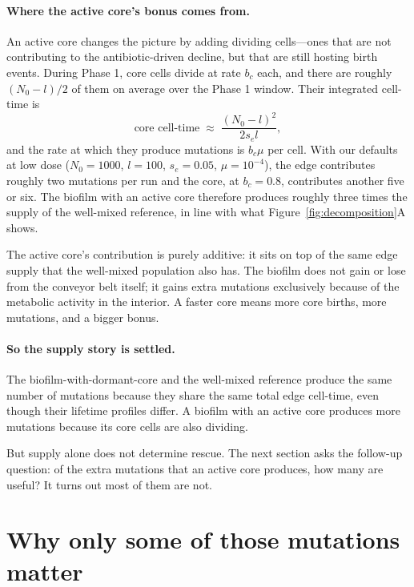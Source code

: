 \documentclass[11pt]{article}
\begin{document}
\paragraph{Where the active core's bonus comes from.}
An active core changes the picture by adding dividing cells---ones
that are not contributing to the antibiotic-driven decline, but that
are still hosting birth events. During Phase 1, core cells divide at
rate $b_c$ each, and there are roughly $(N_0 - l)/2$ of them on
average over the Phase 1 window. Their integrated cell-time is
\[
\text{core cell-time} \;\approx\; \frac{(N_0 - l)^2}{2 s_e l},
\]
and the rate at which they produce mutations is $b_c \mu$ per cell.
With our defaults at low dose ($N_0 = 1000$, $l = 100$, $s_e = 0.05$,
$\mu = 10^{-4}$), the edge contributes roughly two mutations per run
and the core, at $b_c = 0.8$, contributes another five or six. The
biofilm with an active core therefore produces roughly three times
the supply of the well-mixed reference, in line with what
Figure~\ref{fig:decomposition}A shows.

The active core's contribution is purely additive: it sits on top of
the same edge supply that the well-mixed population also has. The
biofilm does not gain or lose from the conveyor belt itself; it gains
extra mutations exclusively because of the metabolic activity in the
interior. A faster core means more core births, more mutations, and a
bigger bonus.

\paragraph{So the supply story is settled.}
The biofilm-with-dormant-core and the well-mixed reference produce
the same number of mutations because they share the same total edge
cell-time, even though their lifetime profiles differ. A biofilm with
an active core produces more mutations because its core cells are
also dividing.

But supply alone does not determine rescue. The next section asks the
follow-up question: of the extra mutations that an active core
produces, how many are useful? It turns out most of them are not.

\section{Why only some of those mutations matter}
\label{sec:delivery}
\end{document}
